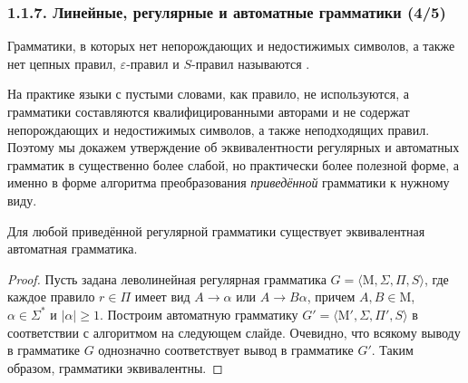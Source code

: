 \begin{frame}
\frametitle{1.1.7. Линейные, регулярные и автоматные грамматики (4/5)}
Грамматики, в которых нет непорождающих 
и недостижимых символов, а также нет 
цепных правил, 
$\varepsilon$-правил и
$S$-правил называются .

\smallskip
На практике языки с пустыми словами, как правило, не используются,
а грамматики составляются квалифицированными авторами и
не содержат непорождающих 
и недостижимых символов, а также неподходящих правил.
Поэтому мы докажем утверждение 
об эквивалентности регулярных и автоматных грамматик
в существенно более
слабой, но практически более полезной форме, а именно в форме
алгоритма преобразования {\em приведённой}  грамматики к нужному виду.

\begin{theorem}
Для любой приведённой регулярной грамматики существует эквивалентная автоматная
грамматика.
\end{theorem}

\begin{proof}
Пусть задана леволинейная регулярная грамматика $G=\langle \mathrm{M}, \Sigma,
\Pi, S\rangle$, где каждое правило $r\in \Pi$ имеет вид $A\rightarrow
\alpha$ или $A\rightarrow B\alpha$, причем $A, B \in \mathrm{M}$,\\
$\alpha\in \Sigma^*$ и $|\alpha|\geq 1$. Построим автоматную грамматику
$G'=\langle \mathrm{M}', \Sigma, \Pi', S\rangle$  в соответствии с алгоритмом на следующем слайде.
 Очевидно, что всякому выводу в грамматике $G$ однозначно
 соответствует вывод в грамматике $G'$. Таким образом, грамматики
 эквивалентны.
\end{proof}
\end{frame}

